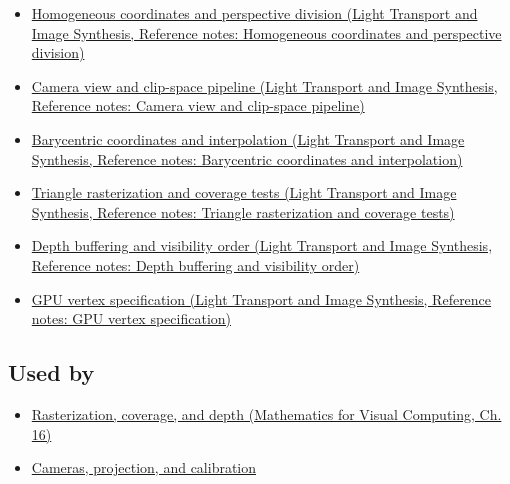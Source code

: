 \hypertarget{appendix-40426e4b2103-prerequisites}{}

\begin{itemize}
\tightlist
\item
  \href{../04-Light-Transport-and-Image-Synthesis/main.pdf\#nameddest=appendix-cb3b26862282}{Homogeneous coordinates and perspective division (Light Transport and Image Synthesis, Reference notes: Homogeneous coordinates and perspective division)}
\item
  \href{../04-Light-Transport-and-Image-Synthesis/main.pdf\#nameddest=appendix-1c07d64f5e70}{Camera view and clip-space pipeline (Light Transport and Image Synthesis, Reference notes: Camera view and clip-space pipeline)}
\item
  \href{../04-Light-Transport-and-Image-Synthesis/main.pdf\#nameddest=appendix-02b9d9a81dca}{Barycentric coordinates and interpolation (Light Transport and Image Synthesis, Reference notes: Barycentric coordinates and interpolation)}
\item
  \href{../04-Light-Transport-and-Image-Synthesis/main.pdf\#nameddest=appendix-ed3f9bc298fe}{Triangle rasterization and coverage tests (Light Transport and Image Synthesis, Reference notes: Triangle rasterization and coverage tests)}
\item
  \href{../04-Light-Transport-and-Image-Synthesis/main.pdf\#nameddest=appendix-97578ed97952}{Depth buffering and visibility order (Light Transport and Image Synthesis, Reference notes: Depth buffering and visibility order)}
\item
  \href{../04-Light-Transport-and-Image-Synthesis/main.pdf\#nameddest=appendix-749ba51a6c25}{GPU vertex specification (Light Transport and Image Synthesis, Reference notes: GPU vertex specification)}
\end{itemize}

\subsection{Used by}\label{appendix-40426e4b2103-used-by}

\hypertarget{appendix-40426e4b2103-used-by}{}

\begin{itemize}
\tightlist
\item
  \href{../02-Mathematics-for-Visual-Computing/main.pdf\#nameddest=03-visual-computing-i-ch012-rasterization-coverage-and-depth}{Rasterization, coverage, and depth (Mathematics for Visual Computing, Ch. 16)}
\item
  \hyperref[03-visual-computing-i-ch003-cameras-projection-and-calibration]{Cameras, projection, and calibration}
\end{itemize}

